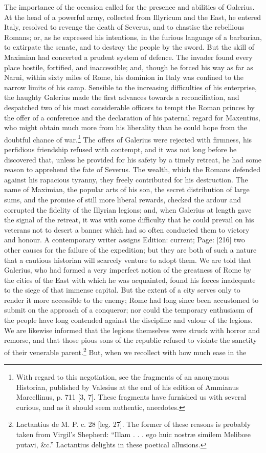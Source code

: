 The importance of the occasion called for the presence and abilities of Galerius. At the head of a powerful army, collected from Illyricum and the East, he entered Italy, resolved to revenge the death of Severus, and to chastise the rebellious Romans; or, as he expressed his intentions, in the furious language of a barbarian, to extirpate the senate, and to destroy the people by the sword. But the skill of Maximian had concerted a prudent system of defence. The invader found every place hostile, fortified, and inaccessible; and, though he forced his way as far as Narni, within sixty miles of Rome, his dominion in Italy was confined to the narrow limits of his camp. Sensible to the increasing difficulties of his enterprise, the haughty Galerius made the first advances towards a reconciliation, and despatched two of his most considerable officers to tempt the Roman princes by the offer of a conference and the declaration of his paternal regard for Maxentius, who might obtain much more from his liberality than he could hope from the doubtful chance of war.\footnote{With regard to this negotiation, see the fragments of an anonymous Historian, published by Valesius at the end of his edition of Ammianus Marcellinus, p. 711 [3, 7]. These fragments have furnished us with several curious, and as it should seem authentic, anecdotes.} The offers of Galerius were rejected with firmness, his perfidious friendship refused with contempt, and it was not long before he discovered that, unless he provided for his safety by a timely retreat, he had some reason to apprehend the fate of Severus. The wealth, which the Romans defended against his rapacious tyranny, they freely contributed for his destruction. The name of Maximian, the popular arts of his son, the secret distribution of large sums, and the promise of still more liberal rewards, checked the ardour and corrupted the fidelity of the Illyrian legions; and, when Galerius at length gave the signal of the retreat, it was with some difficulty that he could prevail on his veterans not to desert a banner which had so often conducted them to victory and honour. A contemporary writer assigns Edition: current; Page: [216] two other causes for the failure of the expedition; but they are both of such a nature that a cautious historian will scarcely venture to adopt them. We are told that Galerius, who had formed a very imperfect notion of the greatness of Rome by the cities of the East with which he was acquainted, found his forces inadequate to the siege of that immense capital. But the extent of a city serves only to render it more accessible to the enemy; Rome had long since been accustomed to submit on the approach of a conqueror; nor could the temporary enthusiasm of the people have long contended against the discipline and valour of the legions. We are likewise informed that the legions themselves were struck with horror and remorse, and that those pious sons of the republic refused to violate the sanctity of their venerable parent.\footnote{Lactantius de M. P. c. 28 [leg. 27]. The former of these reasons is probably taken from Virgil\texthebrew{}’s Shepherd: \texthebrew{“}Illam . . . ego huic nostræ similem Melibœe putavi, \&c.\texthebrew{}” Lactantius delights in these poetical allusions.} But, when we recollect with how much ease in the 